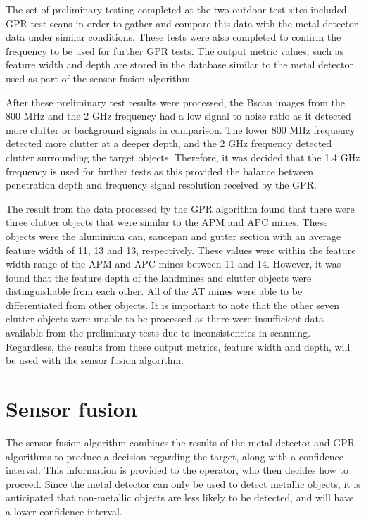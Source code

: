 \documentclass[main.tex]{subfiles}
\begin{document}
The set of preliminary testing completed at the two outdoor test sites included GPR test scans in order to gather and compare this data with the metal detector data under similar conditions. These tests were also completed to confirm the frequency to be used for further GPR tests. The output metric values, such as feature width and depth are stored in the database similar to the metal detector used as part of the sensor fusion algorithm. 

After these preliminary test results were processed, the Bscan images from the 800 MHz and the 2 GHz frequency had a low signal to noise ratio as it detected more clutter or background signals in comparison. The lower 800 MHz frequency detected more clutter at a deeper depth, and the 2 GHz frequency detected clutter surrounding the target objects. Therefore, it was decided that the 1.4 GHz frequency is used for further tests as this provided the balance between penetration depth and frequency signal resolution received by the GPR.

The result from the data processed by the GPR algorithm found that there were three clutter objects that were similar to the APM and APC mines. These objects were the aluminium can, saucepan and gutter section with an average feature width of 11, 13 and 13, respectively. These values were within the feature width range of the APM and APC mines between 11 and 14. However, it was found that the feature depth of the landmines and clutter objects were distinguishable from each other. All of the AT mines were able to be differentiated from other objects. It is important to note that the other seven clutter objects were unable to be processed as there were insufficient data available from the preliminary tests due to inconsistencies in scanning. Regardless, the results from these output metrics, feature width and depth, will be used with the sensor fusion algorithm. 

\section{Sensor fusion}
The sensor fusion algorithm combines the results of the metal detector and GPR algorithms to produce a decision regarding the target, along with a confidence interval. This information is provided to the operator, who then decides how to proceed. Since the metal detector can only be used to detect metallic objects, it is anticipated that non-metallic objects are less likely to be detected, and will have a lower confidence interval. 
\end{document}
